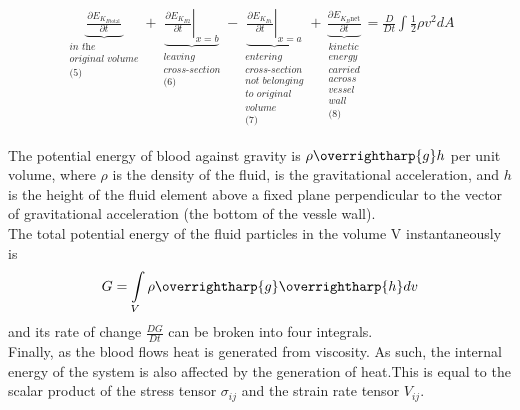 \documentclass[12pt, a4paper]{article}
\theoremstyle{definition}
\theoremstyle{remark}
\theoremstyle{definition}
\newcommand*{\vtr}[1]{\text{\overrightharp{\ensuremath{#1}}}}
\newcommand{\?}{\stackrel{?}{=}}
\renewcommand{\it}[1]{\textit{#1}}
\begin{document}
\begin{align}
\underbrace{\frac{\partial {E}_{K_{B \text{total}}}}{\partial t}}_{\substack{\it{in the} \\ \it{original volume} \\ \it{(5)}}}
 + \underbrace{\left. \frac{\partial {E}_{K_{B2}}}{\partial t} \right|_{x=b}}_{\substack{\it{leaving} \\ \it{cross-section} \\ \it{(6)}}}
 - \underbrace{\left. \frac{\partial {E}_{K_{B1}}}{\partial t} \right|_{x=a}}_{\substack{\it{entering} \\ \it{cross-section} \\ \it{not belonging} \\ \it{to original} \\ \it{volume} \\ \it{(7)}}}
 +\underbrace{\frac{\partial {E}_{{K}_{B}\text{net}}}{\partial t}}_{\substack{\it{kinetic} \\ \it{energy} \\ \it{carried} \\ \it{across} \\ \it{vessel} \\ \it{wall} \\ \it{(8)}}}
 =
 \frac{D}{Dt} \int \frac{1}{2} \rho {v}^{2} dA
\end{align}

\noindent The potential energy of blood against gravity is $\rho \vtr{g} h$ per unit volume, where $\rho$ is the density of the fluid, \vtr{g} is the gravitational acceleration, and $h$ is the height of the fluid element above a fixed plane perpendicular to the vector of gravitational acceleration (the bottom of the vessle wall).\\
The total potential energy of the fluid particles in the volume V instantaneously is\\
\begin{align}
G = \int\limits_{V} \rho \vtr{g} \vtr{h} dv
\end{align}
and its rate of change $\frac{DG}{Dt}$ can be broken into four integrals. \\

\noindent Finally, as the blood flows heat is generated from viscosity. As such, the internal energy of the system is also affected by the generation of heat.This is equal to the scalar product of the stress tensor ${\sigma}_{ij}$ and the strain rate tensor ${V}_{ij}$. 
\end{document}
